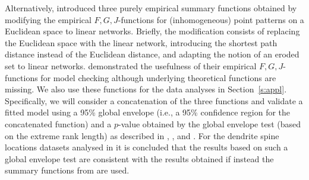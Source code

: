 \documentclass[alpha-refs]{wiley-article}
\begin{document}
Alternatively, \citet{HeidiMe} introduced three purely empirical summary functions obtained by modifying the empirical $F,G,J$-functions for (inhomogeneous)
point patterns on a Euclidean space to linear
networks. Briefly, the modification consists of replacing the Euclidean space with
the linear network, introducing the shortest path distance instead of the Euclidean
distance, and adapting the notion of an eroded set to linear networks. \citet{HeidiMe} demonstrated the usefulness of their empirical $F,G,J$-functions for model checking although underlying theoretical functions are missing. We also use these functions for the data analyses in Section~\ref{s:appl}. Specifically, we will consider a concatenation of the three functions and validate a fitted model using a 95\% global envelope (i.e., a 95\%  confidence region for the concatenated function) and a $p$-value obtained by the 
global envelope test (based on the extreme rank length) as described in \citet{Mylly1}, \citet{Mylly2}, and \citet{Mylly3}. 
For the dendrite spine locations datasets analysed in \citet{HeidiMe} it is concluded that the results based on such a global envelope test are consistent with the results obtained if instead the summary functions from {\citet[][]{CronieEtAl}} are used.  





%   
%

\end{document}
